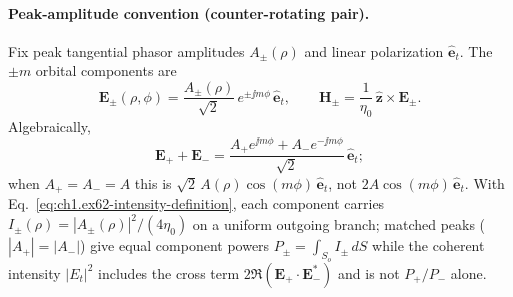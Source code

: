 \paragraph{Peak-amplitude convention (counter-rotating pair).}
Fix peak tangential phasor amplitudes $A_\pm(\rho)$ and linear polarization $\hat{\mathbf{e}}_t$. The $\pm m$ orbital components are
\begin{equation}
\label{eq:ch1.ex62-counter-rotating-components}
\mathbf{E}_\pm(\rho,\phi)=\frac{A_\pm(\rho)}{\sqrt{2}}\,e^{\pm\jj m\phi}\,\hat{\mathbf{e}}_t,
\qquad
\mathbf{H}_\pm=\frac{1}{\eta_0}\,\hat{\mathbf{z}}\times\mathbf{E}_\pm.
\end{equation}
Algebraically,
\begin{equation}
\label{eq:ch1.ex62-counter-rotating-sum-derive}
\mathbf{E}_++\mathbf{E}_-
=\frac{A_+ e^{\jj m\phi}+A_- e^{-\jj m\phi}}{\sqrt{2}}\,\hat{\mathbf{e}}_t;
\end{equation}
when $A_+=A_-=A$ this is $\sqrt{2}\,A(\rho)\cos(m\phi)\,\hat{\mathbf{e}}_t$, not $2A\cos(m\phi)\,\hat{\mathbf{e}}_t$.
With Eq.~\eqref{eq:ch1.ex62-intensity-definition}, each component carries
$I_\pm(\rho)=|A_\pm(\rho)|^2/(4\eta_0)$ on a uniform outgoing branch; matched peaks ($|A_+|=|A_-|$) give equal component powers $P_\pm=\int_{S_o}I_\pm\,dS$ while the coherent intensity $|E_t|^2$ includes the cross term $2\Re(\mathbf{E}_+\cdot\mathbf{E}_-^*)$ and is not $P_+/P_-$ alone.

